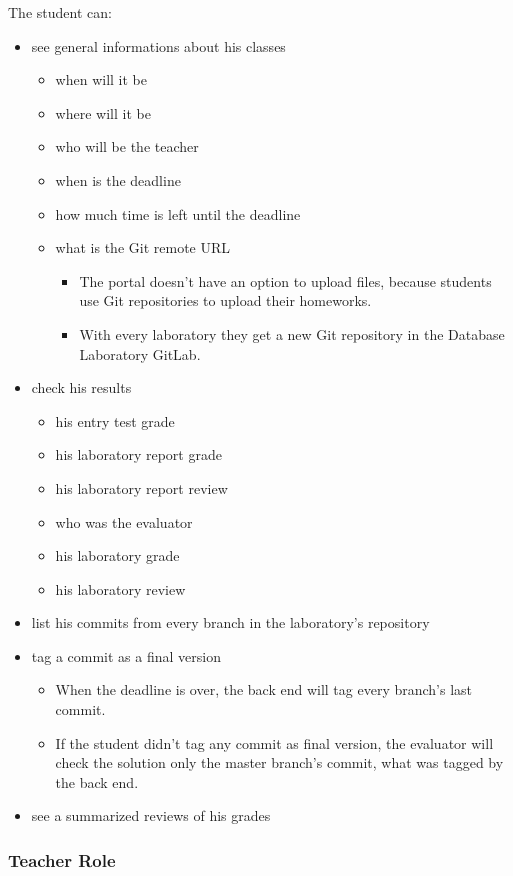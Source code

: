 The student can:

\begin{itemize}
	\item see general informations about his classes
	\begin{itemize}
		\item when will it be
		\item where will it be
		\item who will be the teacher
		\item when is the deadline
		\item how much time is left until the deadline
		\item what is the Git remote URL
		\begin{itemize}
			\item The portal doesn't have an option to upload files, because students use Git repositories to upload their homeworks.
			\item With every laboratory they get a new Git repository in the Database Laboratory GitLab.
		\end{itemize}
	\end{itemize}
	\item check his results
	\begin{itemize}
		\item his entry test grade
		\item his laboratory report grade
		\item his laboratory report review
		\item who was the evaluator
		\item his laboratory grade
		\item his laboratory review
	\end{itemize}
	\item list his commits from every branch in the laboratory's repository
	\item tag a commit as a final version
	\begin{itemize}
		\item When the deadline is over, the back end will tag every branch's last commit.
		\item If the student didn't tag any commit as final version, the evaluator will check the solution only the master branch's commit, what was tagged by the back end.
	\end{itemize}
	\item see a summarized reviews of his grades
\end{itemize}

\subsubsection{Teacher Role}

